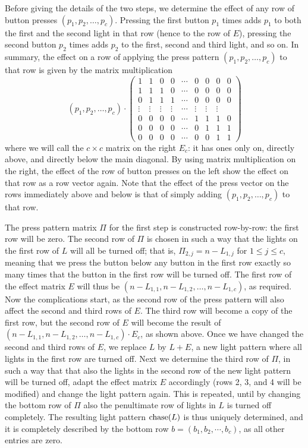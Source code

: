 Before giving the details of the two steps,
we determine the effect of any row of button presses
$(p_1, p_2, \ldots, p_c)$. Pressing the first button $p_1$ times adds $p_1$
to both the first and the second light in that row (hence to the row of $E$),
pressing the second button $p_2$ times adds $p_2$ to the first, second and third
light, and so on. In summary, the effect on a row of applying the press pattern
$(p_1, p_2, \ldots, p_c)$ to that row
is given by the matrix multiplication
$$(p_1, p_2, \ldots, p_c)\cdot
\begin{pmatrix}
1&1&0&0&\cdots&0&0&0&0\\
1&1&1&0&\cdots&0&0&0&0\\
0&1&1&1&\cdots&0&0&0&0\\
\vdots&\vdots&\vdots&\vdots&\cdots&\vdots&\vdots&\vdots\\
0&0&0&0&\cdots&1&1&1&0\\
0&0&0&0&\cdots&0&1&1&1\\
0&0&0&0&\cdots&0&0&1&1
\end{pmatrix}$$
where we will call the $c\times c$ matrix on the right $E_c$: it
has ones only on, directly above, and directly below the main diagonal.
By using matrix multiplication on the right, the effect of the
row of button presses on the left show the effect on that row as
a row vector again. Note that the effect of the press vector on
the rows immediately above and below is that of simply adding
$(p_1, p_2, \ldots, p_c)$ to that row.


The press pattern matrix $\Pi$ for the first step is constructed 
row-by-row: the first row will be zero. The second row of
$\Pi$ is chosen in such a way that the lights on the first row of $L$
will all be turned off; that is, $\Pi_{2,j}=n-L_{1,j}$ for $1\leq j\leq c$,
meaning that we press the button below any button in the first row exactly so many
times that the button in the first row will be turned off. The first row
of the effect matrix $E$ will thus be $(n-L_{1,1}, n-L_{1,2},\ldots,
n-L_{1,c})$, as required. Now the complications start, as the second row
of the press pattern will also affect the second and third rows of $E$.
The third row will become a copy of the first row, but the
second row of $E$ will become the result of
$(n-L_{1,1}, n-L_{1,2},\ldots, n-L_{1,c})\cdot E_c$, as shown above.
Once we have changed the second and third rows of $E$, we replace $L$
by $L+E$, a new light pattern where all lights in the first row are
turned off. Next we determine the third row of $\Pi$, in such a way that
that also the lights in the second row of the new light pattern will
be turned off, adapt the effect matrix $E$ accordingly (rows 2, 3, and 4
will be modified) and change the light pattern again. This is
repeated, until by changing the bottom row of $\Pi$ also the penultimate
row of lights in $L$ is turned off completely. The resulting
light pattern $\operatorname{chase}(L)$ is thus uniquely determined, and it is
completely described by the bottom row $b=(b_1, b_2, \cdots, b_c)$, as
all other entries are zero.

